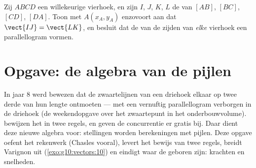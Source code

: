 \begin{exercise}[$\star\star\star$]\label{exo:g10:vectors:10}
Zij $ABCD$ een willekeurige vierhoek, en zijn $I$, $J$, $K$, $L$ de 
van $[AB]$, $[BC]$, $[CD]$, $[DA]$. Toon met  $A(x_A, y_A)$
enzovoort aan dat $\vect{IJ} = \vect{LK}$, en besluit dat de  van de
zijden van \emph{elke} vierhoek een parallellogram vormen.
\end{exercise}

\section{Opgave: de algebra van de pijlen}

\begin{problem}
\label{pb:g10:vectors:1}
In jaar 8 werd bewezen dat de zwaartelijnen van een driehoek elkaar op twee
derde van hun lengte ontmoeten --- met een vernuftig parallellogram verborgen
in de driehoek (de weekendopgave over het zwaartepunt in het
onderbouwvolume).  bewijzen het in twee regels, en geven de
concurrentie er gratis bij. Daar dient deze nieuwe algebra voor: stellingen
worden berekeningen met pijlen. Deze opgave oefent het rekenwerk (Chasles
vooral), levert het bewijs van twee regels, breidt Varignon uit
(\cref{exo:g10:vectors:10}) en eindigt waar de  geboren zijn:
krachten en snelheden.


\end{problem}
